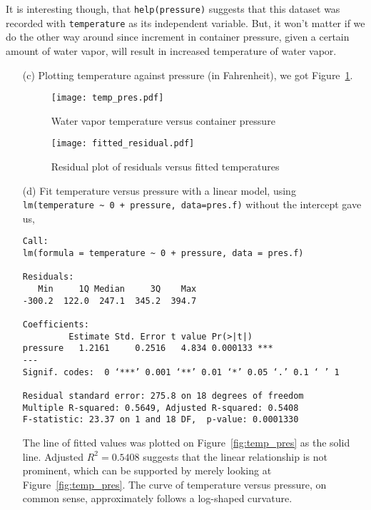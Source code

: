 \documentclass[letter]{article}
\begin{document}
    It is interesting though, that \verb=help(pressure)= suggests that this
    dataset was recorded with \verb=temperature= as its independent variable.
    But, it won't matter if we do the other way around since increment in
    container pressure, given a certain amount of water vapor, will result in
    increased temperature of water vapor. 

    \begin{enumerate}
    \item[(c)]
    Plotting temperature against pressure (in Fahrenheit), we got
    Figure~\ref{fig:res_plot}.
    \begin{figure}[htp]
        \centering
        \begin{minipage}[b]{0.45\textwidth}
        \texttt{[image: temp\_pres.pdf]}
        \caption{Water vapor temperature versus container pressure}
        \label{fig:temp_pres}
        \end{minipage}
        \begin{minipage}[b]{0.45\textwidth}
        \texttt{[image: fitted\_residual.pdf]}
        \caption{Residual plot of residuals versus fitted temperatures}
        \label{fig:res_plot}
        \end{minipage}
    \end{figure}
    \item[(d)]
    Fit temperature versus pressure with a linear model, using 
    \verb|lm(temperature ~ 0 + pressure, data=pres.f)| without the intercept
    gave us,
    \begin{verbatim}
Call:
lm(formula = temperature ~ 0 + pressure, data = pres.f)

Residuals:
   Min     1Q Median     3Q    Max 
-300.2  122.0  247.1  345.2  394.7 

Coefficients:
         Estimate Std. Error t value Pr(>|t|)    
pressure   1.2161     0.2516   4.834 0.000133 ***
---
Signif. codes:  0 ‘***’ 0.001 ‘**’ 0.01 ‘*’ 0.05 ‘.’ 0.1 ‘ ’ 1 

Residual standard error: 275.8 on 18 degrees of freedom
Multiple R-squared: 0.5649, Adjusted R-squared: 0.5408 
F-statistic: 23.37 on 1 and 18 DF,  p-value: 0.0001330 
    \end{verbatim}
    The line of fitted values was plotted on Figure~\ref{fig:temp_pres} as the
    solid line. Adjusted $R^2 = 0.5408$ suggests that the linear relationship
    is not prominent, which can be supported by merely looking at
    Figure~\ref{fig:temp_pres}. The curve of temperature versus pressure, on
    common sense, approximately follows a log-shaped curvature. 


\end{enumerate}
\end{document}
